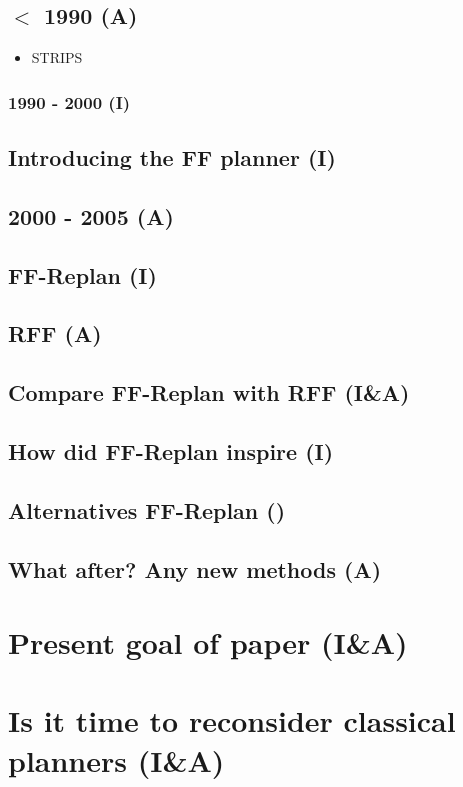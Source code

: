 \documentclass[runningheads,a4paper]{llncs}
\begin{document}
\subsection{$<$ 1990 (A)}

\begin{itemize}
	\item STRIPS
\end{itemize}

\subsubsection{1990 - 2000 (I)}

\subsection{Introducing the FF planner (I)}

\subsection{2000 - 2005 (A)}

\subsection{FF-Replan (I)}

\subsection{RFF (A)}

\subsection{Compare FF-Replan with RFF (I\&A)}

\subsection{How did FF-Replan inspire (I)}

\subsection{Alternatives FF-Replan ()}

\subsection{What after? Any new methods (A)}

\section{Present goal of paper (I\&A)}

\section{Is it time to reconsider classical planners (I\&A)}
\end{document}

